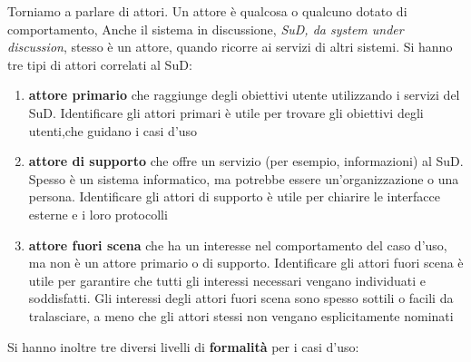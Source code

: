 \documentclass[a4paper,12pt, oneside]{book}
\begin{document}
Torniamo a parlare di attori. Un attore è qualcosa o qualcuno dotato di comportamento, Anche il sistema in discussione,\textit{ SuD, da system under discussion}, stesso è un attore, quando ricorre ai servizi di altri sistemi. Si hanno tre tipi di attori correlati al SuD:
\begin{enumerate}
	\item \textbf{attore primario} che raggiunge degli obiettivi utente utilizzando i servizi del SuD. Identificare gli attori primari è utile per trovare gli obiettivi degli utenti,che guidano i casi d'uso
	\item \textbf{attore di supporto} che offre un servizio (per esempio, informazioni) al SuD. Spesso è un sistema informatico, ma potrebbe essere un'organizzazione o una
	persona. Identificare gli attori di supporto è utile per chiarire le interfacce esterne e i loro protocolli
	\item \textbf{attore fuori scena} che ha un interesse nel comportamento del caso d'uso, ma non è
	un attore primario o di supporto. Identificare gli attori fuori scena è utile per garantire che tutti gli interessi necessari vengano individuati e soddisfatti. Gli interessi degli attori fuori scena sono spesso sottili o facili da tralasciare, a meno che gli attori stessi non vengano esplicitamente nominati
\end{enumerate}
Si hanno inoltre tre diversi livelli di \textbf{formalità} per i casi d'uso:
\end{document}
